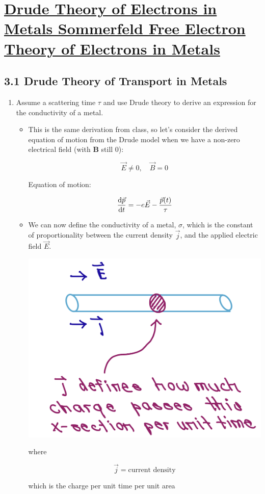 \section[Drude Theory of Electrons in Metals Sommerfeld Free Electron Theory of Electrons in Metals]{\hyperlink{toc}{Drude Theory of Electrons in Metals Sommerfeld Free Electron Theory of Electrons in Metals}}


\subsection*{3.1 \quad Drude Theory of Transport in Metals}

\begin{enumerate}[label=(\alph*)]
\item Assume a scattering time $\tau$ and use Drude theory to derive an expression for the conductivity of a metal.


\divider 

\begin{itemize}
    \item This is the same derivation from class, so let's consider the derived equation of motion from the Drude model when we have a non-zero electrical field (with $\mathbf{B}$ still 0):
    
    \[ \vec{E} \neq 0, \quad \vec{B} = 0 \]

    Equation of motion:

    \[ \dv{\vec{p}}{t} = -e \vec{E} - \frac{\vec{p}(t)}{\tau} \]

    \item We can now define the conductivity of a metal, $\sigma$, which is the constant of proportionality between the current density $\vec{j}$, and the applied electric field $\vec{E}$.
    
    \begin{center}
        \includegraphics[width = 0.3 \linewidth]{Images/current-density.png}
    \end{center}

    where

    \[\vec{j} = \text{current density} \]
    
    which is the charge per unit time per unit area


\end{itemize}
\end{enumerate}
